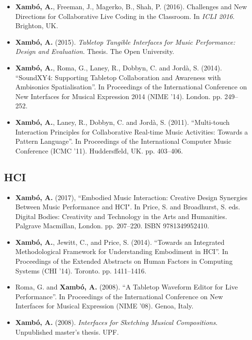 \documentclass[10pt, a4paper]{article}
\begin{document}
\begin{itemize}
\item \textbf{Xambó, A.}, Freeman, J., Magerko, B., Shah, P. (2016). Challenges and New Directions for Collaborative Live Coding in the Classroom. In \emph{ICLI 2016}. Brighton, UK.
\item \textbf{Xambó, A.} (2015). \emph{Tabletop Tangible Interfaces for Music Performance: Design and Evaluation}. Thesis. The Open University.
\item \textbf{Xambó, A.}, Roma, G., Laney, R., Dobbyn, C. and Jordà, S. (2014). “SoundXY4: Supporting Tabletop Collaboration and Awareness with Ambisonics Spatialisation”. In Proceedings of the International Conference on New Interfaces for Musical Expression 2014 (NIME ’14). London. pp. 249–252.
\item \textbf{Xambó, A.}, Laney, R., Dobbyn, C. and Jordà, S. (2011). “Multi-touch Interaction Principles for Collaborative Real-time Music Activities: Towards a Pattern Language”. In Proceedings of the International Computer Music Conference (ICMC ’11). Huddersffeld, UK. pp. 403–406.
\end{itemize}

\subsection*{HCI}

\begin{itemize}
\item \textbf{Xambó, A.} (2017), “Embodied Music Interaction: Creative Design Synergies Between Music Performance and HCI". In Price, S. and Broadhurst, S. eds. Digital Bodies: Creativity and Technology in the Arts and Humanities. Palgrave Macmillan, London. pp. 207--220. ISBN 9781349952410.
\item \textbf{Xambó, A.}, Jewitt, C., and Price, S. (2014). “Towards an Integrated Methodological Framework for Understanding Embodiment in HCI”. In Proceedings of the Extended Abstracts on Human Factors in Computing Systems (CHI ’14). Toronto. pp. 1411--1416.
\item Roma, G. and \textbf{Xambó, A.} (2008). “A Tabletop Waveform Editor for Live Performance”. In Proceedings of the International Conference on New Interfaces for Musical Expression (NIME ’08). Genoa, Italy.
\item \textbf{Xambó, A.} (2008). \emph{Interfaces for Sketching Musical Compositions}. Unpublished master’s thesis. UPF.
\end{itemize}
\end{document}
